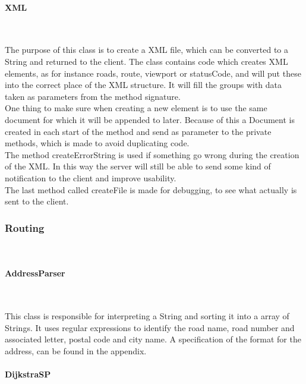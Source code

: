\documentclass[a4paper,10pt,titlepage]{article}
\begin{document}
				
				\paragraph{XML}\mbox{}\
				
The purpose of this class is to create a XML file, which can be converted to a String and returned to the client. The class contains code which creates XML elements, as for instance roads, route, viewport or statusCode, and will put these into the correct place of the XML structure. It will fill the groups with data taken as parameters from the method signature. \\
One thing to make sure when creating a new element is to use the same document for which it will be appended to later. Because of this a Document is created in each start of the method and send as parameter to the private methods, which is made to avoid duplicating code.\\
The method createErrorString is used if something go wrong during the creation of the XML. In this way the server will still be able to send some kind of notification to the client and improve usability.\\
The last method called createFile is made for debugging, to see what actually is sent to the client.\\


				
			\subsubsection{Routing}\
			
				\paragraph{AddressParser}\mbox{}\
				
This class is responsible for interpreting a String and sorting it into a array of Strings. It uses regular expressions to identify the road name, road number and associated letter, postal code and city name. A specification of the format for the address, can be found in the appendix.
				
				\paragraph{DijkstraSP \cite{sedgewickAndWayneDijkstraSP}}\mbox{}\
				
\end{document}
